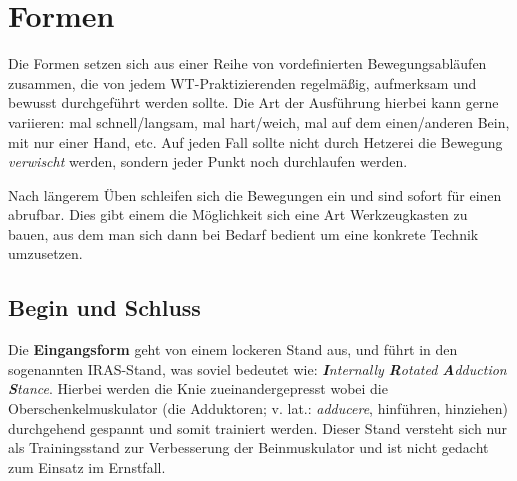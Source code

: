 
\newenvironment{WTSatzTeil}[2]
	{\paragraph{#1} (\textit{#2})}
	{}

\newenvironment{WTSatz}[1]
	{\WTGaleryResetSlideshowCounter \subsubsection{#1}}
	{}

\def\WTXFormen_EingangsGraphics#1{\texttt{[image: resources/images/eingangsform/\#1]}}


\section{Formen}

Die Formen setzen sich aus einer Reihe von vordefinierten Bewegungsabl\"aufen zusammen, die von jedem WT-Praktizierenden regelm\"a{\ss}ig, aufmerksam und bewusst durchgef\"uhrt werden sollte. Die Art der Ausf\"uhrung hierbei kann gerne variieren: mal schnell/langsam, mal hart/weich, mal auf dem einen/anderen Bein, mit nur einer Hand, etc. Auf jeden Fall sollte nicht durch Hetzerei die Bewegung \textit{verwischt} werden, sondern jeder Punkt noch durchlaufen werden.

Nach l\"angerem \"Uben schleifen sich die Bewegungen ein und sind sofort f\"ur einen abrufbar. Dies gibt einem die M\"oglichkeit sich eine Art Werkzeugkasten zu bauen, aus dem man sich dann bei Bedarf bedient um eine konkrete Technik umzusetzen.

\subsection{Begin und Schluss}

Die \textbf{Eingangsform} geht von einem lockeren Stand aus, und f\"uhrt in den sogenannten IRAS-Stand, was soviel bedeutet wie: \textit{\textbf{I}nternally \textbf{R}otated \textbf{A}dduction \textbf{S}tance}. Hierbei werden die Knie zueinandergepresst wobei die Oberschenkelmuskulator (die Adduktoren; v. lat.: \textit{adducere}, hinf\"uhren, hinziehen) durchgehend gespannt und somit trainiert werden. Dieser Stand versteht sich nur als Trainingsstand zur Verbesserung der Beinmuskulator und ist nicht gedacht zum Einsatz im Ernstfall.


